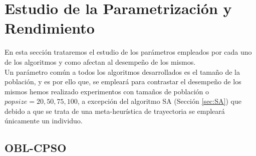 \newpage
 
\section{Estudio de la Parametrización y Rendimiento}\label{sec:PARAM}

En esta sección trataremos el estudio de los parámetros empleados por cada uno de los algoritmos y como afectan al desempeño de los mismos. \\

Un parámetro común a todos los algoritmos desarrollados es el tamaño de la población, y es por ello que, se empleará para contrastar el desempeño de los mismos hemos realizado experimentos con tamaños de población o $popsize = 20, 50, 75, 100$, a excepción del algoritmo SA (Sección \ref{sec:SA}) que debido a que se trata de una meta-heurística de trayectoria se empleará únicamente un individuo.

\subsection{OBL-CPSO}\label{sec:paramOBL_CPSO}

